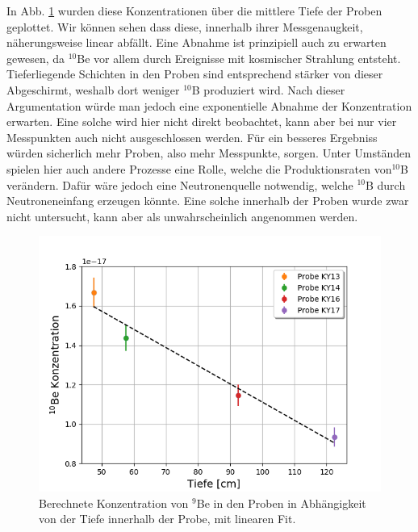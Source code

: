 In Abb. \ref{deep} wurden diese Konzentrationen über die mittlere Tiefe der Proben geplottet.
Wir können sehen dass diese, innerhalb ihrer Messgenaugkeit, näherungsweise linear abfällt.
Eine Abnahme ist prinzipiell auch zu erwarten gewesen, da $^{10}$Be vor allem durch Ereignisse mit kosmischer Strahlung entsteht.
Tieferliegende Schichten in den Proben sind entsprechend stärker von dieser Abgeschirmt, weshalb dort weniger $^{10}$B produziert wird.
Nach dieser Argumentation würde man jedoch eine exponentielle Abnahme der Konzentration erwarten.
Eine solche wird hier nicht direkt beobachtet, kann aber bei nur vier Messpunkten auch nicht ausgeschlossen werden.
Für ein besseres Ergebniss würden sicherlich mehr Proben, also mehr Messpunkte, sorgen.
Unter Umständen spielen hier auch andere Prozesse eine Rolle, welche die Produktionsraten von$^{10}$B verändern.
Dafür wäre jedoch eine Neutronenquelle notwendig, welche $^{10}$B durch Neutroneneinfang erzeugen könnte.
Eine solche innerhalb der Proben wurde zwar nicht untersucht, kann aber als unwahrscheinlich angenommen werden.

\begin{figure}[ht]
  \centering
  \includegraphics[width=0.7\linewidth]{Pictures/10be_konzentration.png}
  \caption{Berechnete Konzentration von $^9$Be in den Proben in Abhängigkeit von der Tiefe innerhalb der Probe, mit linearen Fit.}
  \label{deep}
\end{figure}
\clearpage
